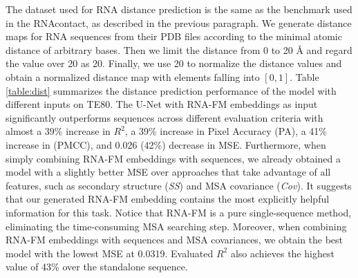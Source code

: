 The dataset used for RNA distance prediction is the same as the benchmark used in the RNAcontact, as described in the previous paragraph. We generate distance maps for RNA sequences from their PDB files according to the minimal atomic distance of arbitrary bases. Then we limit the distance from 0 to 20 \r{A} and regard the value over 20 as 20. Finally, we use 20 to normalize the distance values and obtain a normalized distance map with elements falling into $[0,1]$.
Table \ref{table:dist} summarizes the distance prediction performance of the model with different inputs on TE80. The U-Net with RNA-FM embeddings as input significantly outperforms sequences across different evaluation criteria with almost a 39\% increase in $R^2$, a 39\% increase in Pixel Accuracy (PA), a 41\% increase in (PMCC), and 0.026 (42\%) decrease in MSE. Furthermore, when simply combining RNA-FM embeddings with sequences, we already obtained a model with a slightly better MSE over approaches that take advantage of all features, such as secondary structure (\textit{SS}) and MSA covariance (\textit{Cov}). It suggests that our generated RNA-FM embedding contains the most explicitly helpful information for this task. Notice that RNA-FM is a pure single-sequence method, eliminating the time-consuming MSA searching step. Moreover, when combining RNA-FM embeddings with sequences and MSA covariances, we obtain the best model with the lowest MSE at 0.0319. Evaluated $R^2$ also achieves the highest value of 43\% over the standalone sequence.

